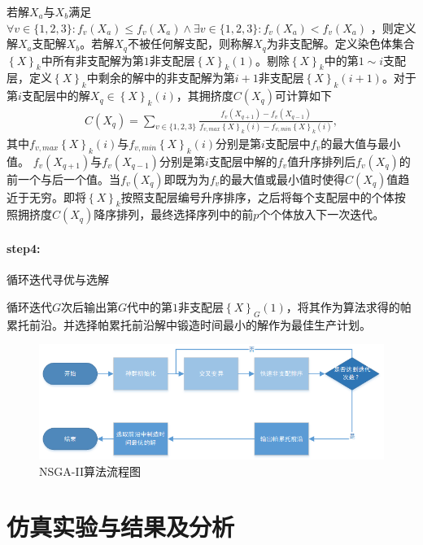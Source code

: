 \documentclass{whutmod}
\begin{document}
	     若解$X_a$与$X_b$满足$\forall v\in\{1,2,3\}:f_v(X_a)\leqslant f_v(X_a)\wedge \exists v\in\{1,2,3\}:f_v(X_a)< f_v(X_a)$ ，则定义解$X_a$支配解$X_b$。若解$X_q$不被任何解支配，则称解$X_q$为非支配解。定义染色体集合$\left \{ X \right \}_k$中所有非支配解为第$1$非支配层$\left \{ X \right \}_k(1)$。剔除$\left \{ X \right \}_k$中的第$1\sim i$支配层，定义$\left \{ X \right \}_k$中剩余的解中的非支配解为第$i+1$非支配层$\left \{ X \right \}_k(i+1)$。对于第$i$支配层中的解$X_q\in \left \{ X \right \}_k(i)$，其拥挤度$C(X_q)$可计算如下
	     \begin{gather*}
	   C(X_q)=\sum_{v\in\{1,2,3\}} \frac { f_{v}(X_{q+1})- f_{v}(X_{q-1})} { f_{v,max}\left \{ X \right \}_k(i)- f_{v,min}\left \{ X \right \}_k(i)},
	     \end{gather*}
	     其中$f_{v,max}\left \{ X \right \}_k(i)$与$f_{v,min} \left \{ X \right \}_k(i)$分别是第$i$支配层中$f_{v}$的最大值与最小值。 $f_{v}(X_{q+1})$与$f_{v}(X_{q-1})$分别是第$i$支配层中解的$f_{v}$值升序排列后$f_{v}(X_{q})$的前一个与后一个值。当$f_{v}(X_{q})$即既为为$f_{v}$的最大值或最小值时使得$C(X_q)$值趋近于无穷。即将$\left \{ X \right \}_k$按照支配层编号升序排序，之后将每个支配层中的个体按照拥挤度$C(X_q)$降序排列，最终选择序列中的前$p$个个体放入下一次迭代。
	     
	     \paragraph{step4:}循环迭代寻优与选解
	     
	     循环迭代$G$次后输出第$G$代中的第$1$非支配层$\left \{ X \right \}_G(1)$，将其作为算法求得的帕累托前沿。并选择帕累托前沿解中锻造时间最小的解作为最佳生产计划。
	     \begin{figure}[H]
	     	\centering
	     	\includegraphics[width=\textwidth]{figures/liuz.png}
	     	\caption{NSGA-II算法流程图}\label{111sad1sssss11}
	     \end{figure}



\newpage
        \section{仿真实验与结果及分析}
\end{document}
